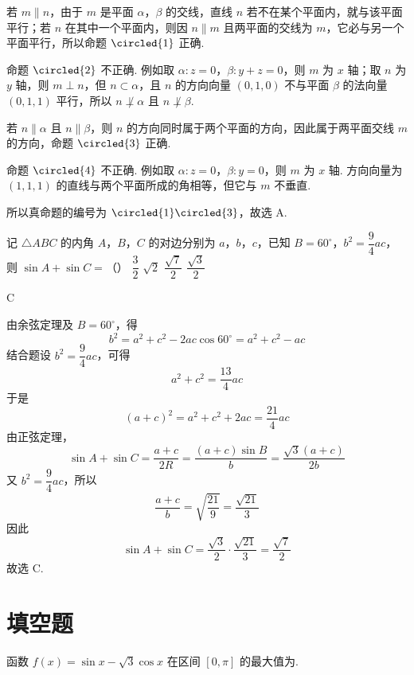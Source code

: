 \begin{solution}
若 \(m\parallel n\)，由于 \(m\) 是平面 \(\alpha\)，\(\beta\) 的交线，直线 \(n\) 若不在某个平面内，就与该平面平行；若 \(n\) 在其中一个平面内，则因 \(n\parallel m\) 且两平面的交线为 \(m\)，它必与另一个平面平行，所以命题 \(\circled{1}\) 正确.

命题 \(\circled{2}\) 不正确. 例如取 \(\alpha:z=0\)，\(\beta:y+z=0\)，则 \(m\) 为 \(x\) 轴；取 \(n\) 为 \(y\) 轴，则 \(m\perp n\)，但 \(n\subset\alpha\)，且 \(n\) 的方向向量 \((0,1,0)\) 不与平面 \(\beta\) 的法向量 \((0,1,1)\) 平行，所以 \(n\not\perp\alpha\) 且 \(n\not\perp\beta\).

若 \(n\parallel\alpha\) 且 \(n\parallel\beta\)，则 \(n\) 的方向同时属于两个平面的方向，因此属于两平面交线 \(m\) 的方向，命题 \(\circled{3}\) 正确.

命题 \(\circled{4}\) 不正确. 例如取 \(\alpha:z=0\)，\(\beta:y=0\)，则 \(m\) 为 \(x\) 轴. 方向向量为 \((1,1,1)\) 的直线与两个平面所成的角相等，但它与 \(m\) 不垂直.

所以真命题的编号为 \(\circled{1}\circled{3}\)，故选 A.
\end{solution}

\begin{problem}
记 \(\triangle ABC\) 的内角 \(A\)，\(B\)，\(C\) 的对边分别为 \(a\)，\(b\)，\(c\)，已知 \(B=60^\circ\)，\(b^2=\dfrac94ac\)，则 \(\sin A+\sin C=\)（\quad）
\choices
    {\(\dfrac32\)}
    {\(\sqrt2\)}
    {\(\dfrac{\sqrt7}{2}\)}
    {\(\dfrac{\sqrt3}{2}\)}
\end{problem}

\begin{answer}
C
\end{answer}

\begin{solution}
由余弦定理及 \(B=60^\circ\)，得
\[
b^2=a^2+c^2-2ac\cos60^\circ=a^2+c^2-ac
\]
结合题设 \(b^2=\dfrac94ac\)，可得
\[
a^2+c^2=\frac{13}{4}ac
\]
于是
\[
(a+c)^2=a^2+c^2+2ac=\frac{21}{4}ac
\]
由正弦定理，
\[
\sin A+\sin C=\frac{a+c}{2R}
=\frac{(a+c)\sin B}{b}
=\frac{\sqrt3(a+c)}{2b}
\]
又 \(b^2=\dfrac94ac\)，所以
\[
\frac{a+c}{b}=\sqrt{\frac{21}{9}}=\frac{\sqrt{21}}3
\]
因此
\[
\sin A+\sin C=\frac{\sqrt3}{2}\cdot\frac{\sqrt{21}}3=\frac{\sqrt7}{2}
\]
故选 C.
\end{solution}

\section{填空题}

\begin{problem}
函数 \(f(x)=\sin x-\sqrt3\cos x\) 在区间 \([0,\pi]\) 的最大值为\fillinblank{}.
\end{problem}

